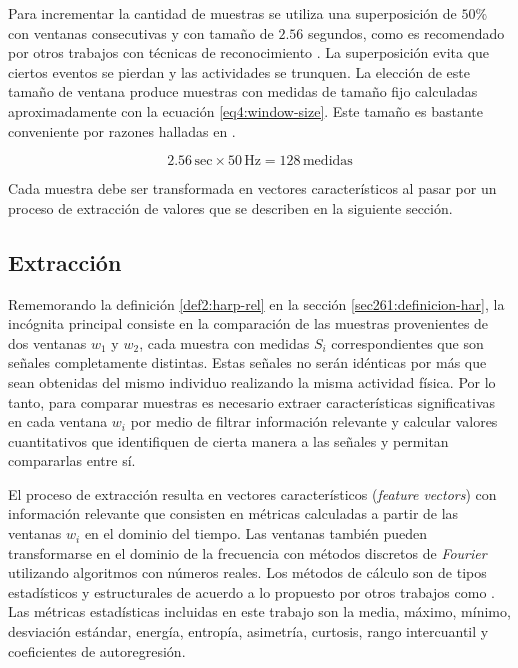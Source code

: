 Para incrementar la cantidad de muestras se utiliza una superposición
de $50\%$ con ventanas consecutivas y con tamaño de $2.56$ segundos,
como es recomendado por otros trabajos con técnicas de reconocimiento
\cite{Bao2004,ReyesOrtiz2015}. La superposición evita que ciertos
eventos se pierdan y las actividades se trunquen. La elección de este
tamaño de ventana produce muestras con medidas de tamaño fijo calculadas
aproximadamente con la ecuación \ref{eq4:window-size}. Este tamaño
es bastante conveniente por razones halladas en \cite{ReyesOrtiz2015}.

\begin{equation}
2.56\,\mathrm{sec}\times50\mathrm{\,Hz}=128\,\mathrm{medidas}\label{eq4:window-size}
\end{equation}

Cada muestra debe ser transformada en vectores característicos al
pasar por un proceso de extracción de valores que se describen en
la siguiente sección.

\subsection{Extracción}

\label{ssec44:extraction}Rememorando la definición \ref{def2:harp-rel}
en la sección \ref{sec261:definicion-har}, la incógnita principal
consiste en la comparación de las muestras provenientes de dos ventanas
$w_{1}$ y $w_{2}$, cada muestra con medidas $S_{i}$ correspondientes
que son señales completamente distintas. Estas señales no serán idénticas
por más que sean obtenidas del mismo individuo realizando la misma
actividad física. Por lo tanto, para comparar muestras es necesario
extraer características significativas en cada ventana $w_{i}$ por
medio de filtrar información relevante y calcular valores cuantitativos
que identifiquen de cierta manera a las señales y permitan compararlas
entre sí. 

El proceso de extracción resulta en vectores característicos (\emph{feature
vectors}) con información relevante que consisten en métricas calculadas
a partir de las ventanas $w_{i}$ en el dominio del tiempo. Las ventanas
también pueden transformarse en el dominio de la frecuencia con métodos
discretos de \emph{Fourier} utilizando algoritmos  con
números reales. Los métodos de cálculo son de tipos estadísticos y
estructurales \cite{LaraLabrador2013} de acuerdo a lo propuesto por
otros trabajos como \cite{Yang2009,Bao2004}. Las métricas estadísticas
incluidas en este trabajo son la media, máximo, mínimo, desviación
estándar, energía, entropía, asimetría, curtosis, rango intercuantil
y coeficientes de autoregresión.

